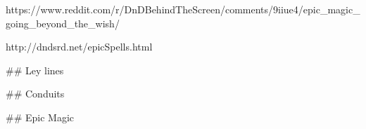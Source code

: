 

https://www.reddit.com/r/DnDBehindTheScreen/comments/9iiue4/epic_magic_going_beyond_the_wish/

http://dndsrd.net/epicSpells.html




## Ley lines

## Conduits

## Epic Magic

